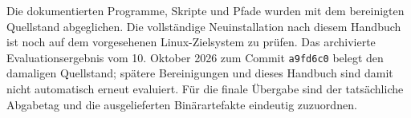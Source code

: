 \documentclass[12pt,a4paper]{article}
\begin{document}
Die dokumentierten Programme, Skripte und Pfade wurden mit dem bereinigten
Quellstand abgeglichen. Die vollständige Neuinstallation nach diesem Handbuch
ist noch auf dem vorgesehenen Linux-Zielsystem zu prüfen. Das archivierte
Evaluationsergebnis vom 10. Oktober 2026 zum Commit \texttt{a9fd6c0} belegt den
damaligen Quellstand; spätere Bereinigungen und dieses Handbuch sind damit nicht
automatisch erneut evaluiert. Für die finale Übergabe sind der tatsächliche
Abgabetag und die ausgelieferten Binärartefakte eindeutig zuzuordnen.
\end{document}

